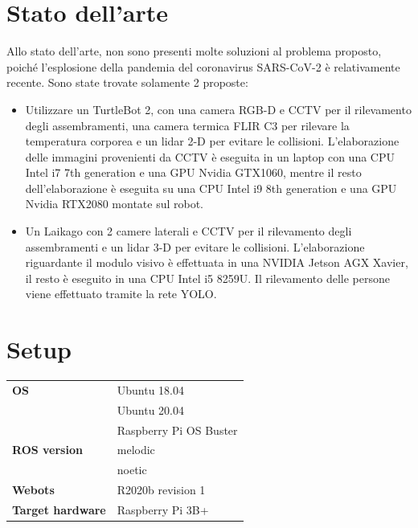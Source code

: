 \documentclass[a4paper]{article}
\begin{document}
	\section{Stato dell'arte}\label{sec:Stato-dell-arte}
	Allo stato dell'arte, non sono presenti molte soluzioni al problema proposto, poiché l'esplosione della pandemia del coronavirus SARS-CoV-2 è relativamente recente. Sono state trovate solamente 2 proposte:
	\begin{itemize} 
		\item Utilizzare un TurtleBot 2, con una camera RGB-D e CCTV per il rilevamento degli
		assembramenti, una camera termica FLIR C3 per rilevare la temperatura corporea e un
		lidar 2-D per evitare le collisioni. L'elaborazione delle immagini provenienti da CCTV è eseguita in un laptop con una CPU Intel i7 7th generation e una GPU Nvidia GTX1060, mentre il resto dell'elaborazione è eseguita su una CPU Intel i9 8th generation e una GPU Nvidia RTX2080 montate sul robot.~\cite{sathyamoorthy2020covidrobot}
	
		\item Un Laikago con 2 camere laterali e CCTV per il rilevamento degli
		assembramenti e un lidar 3-D per evitare le collisioni. 
		L'elaborazione riguardante il modulo visivo è effettuata in una NVIDIA Jetson AGX Xavier,
		il resto è eseguito in una CPU Intel i5 8259U. Il rilevamento delle persone viene effettuato tramite la rete YOLO.~\cite{fan2020autonomous}
	\end{itemize}
	
	
	\section{Setup}\label{sec:Setup}
	\begin{table}[H]
		\centering
		\begin{tabular}{l l}
			\hline
			{\bf OS} & Ubuntu 18.04 \\
					 & Ubuntu 20.04 \\ 
					 & Raspberry Pi OS Buster \\ \hline
			{\bf ROS version} & melodic \\
							  & noetic \\ \hline
			\textbf{Webots} & R2020b revision 1\\ \hline
			{\bf Target hardware} & Raspberry Pi 3B+ \\ \hline
		\end{tabular}
	\end{table}
	
\end{document}
